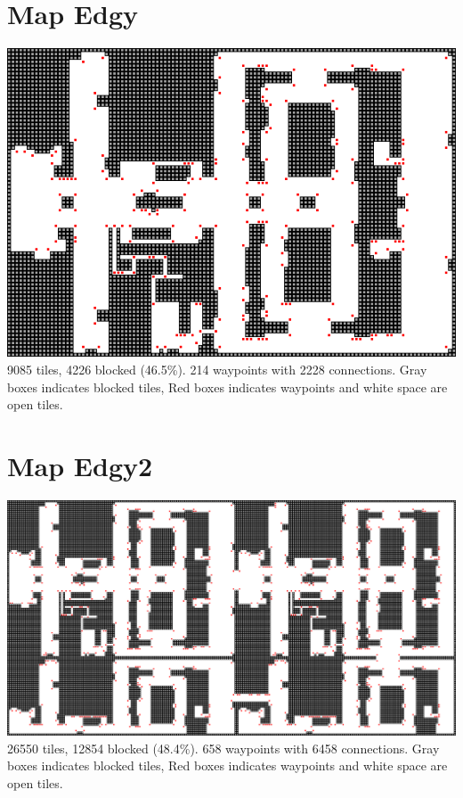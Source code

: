 \documentclass[a4paper]{article}
\begin{document}
\clearpage
\onecolumn
\appendix
\appendixpage
\addappheadtotoc

\section{Map Edgy}\label{ap.edgy}
\centering
\includegraphics[width=\textwidth,height=\textheight,keepaspectratio]{ChartsAndFigures/Edgy.png}
9085 tiles, 4226 blocked (46.5\%). 214 waypoints with 2228 connections. Gray boxes indicates blocked tiles, Red boxes indicates waypoints and white space are open tiles.

\flushleft
\pagebreak
\section{Map Edgy2}\label{ap.edgy2}
\centering
\includegraphics[width=\textwidth,height=\textheight,keepaspectratio]{ChartsAndFigures/Edgy2.png}
26550 tiles, 12854 blocked (48.4\%). 658 waypoints with 6458 connections. Gray boxes indicates blocked tiles, Red boxes indicates waypoints and white space are open tiles.
\end{document}
